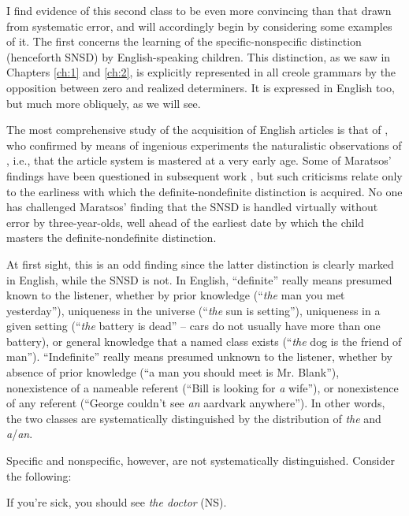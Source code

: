 I find evidence of this second class to be even more convincing than that drawn from systematic error, and will accordingly begin by considering some examples of it. The first concerns the learning of the specific-nonspecific distinction (henceforth SNSD) by English-speaking children. This distinction, as we saw in Chapters \ref{ch:1} and \ref{ch:2}, is explicitly represented in all creole grammars by the opposition
between zero and realized determiners. It is expressed in English too, but much more obliquely, as we will see.

The most comprehensive study of the acquisition of English articles is that of \citet{Maratsos1974,Maratsos1976}, who confirmed by means of ingenious experiments the naturalistic observations of \citet{Brown1973}, i.e., that the article system is mastered at a very early age. Some of Maratsos' findings have been questioned in subsequent work \citep{Warden1976,Karmiloff-Smith1979}, but such criticisms relate only to the earliness with which the definite-nondefinite distinction is acquired. No one has challenged Maratsos' finding that the SNSD is handled virtually without error by three-year-olds, well ahead of the earliest date by which the child masters the definite-nondefinite distinction.

At first sight, this is an odd finding since the latter distinction is clearly marked in English, while the SNSD is not. In English, ``definite'' really means presumed known to the listener, whether by prior knowledge (``\textit{the} man you met yesterday''), uniqueness in the universe (``\textit{the} sun is setting''), uniqueness in a given setting (``\textit{the} battery is dead'' -- cars do not usually have more than one battery), or general knowledge that a named class exists (``\textit{the} dog is the friend of man''). ``Indefinite'' really means presumed unknown to the listener, whether by absence of prior knowledge (``a man you should meet is Mr. Blank''), nonexistence of a nameable referent (``Bill is looking for \textit{a} wife''), or nonexistence of any referent (``George couldn't see \textit{an} aardvark anywhere''). In other words, the two classes are systematically distinguished by the distribution of \textit{the} and \textit{a}/\textit{an}.

Specific and nonspecific, however, are not systematically distinguished. Consider the following:

\ea\label{ex:3:1}
 If you're sick, you should see \textit{the doctor} (NS).
\z

